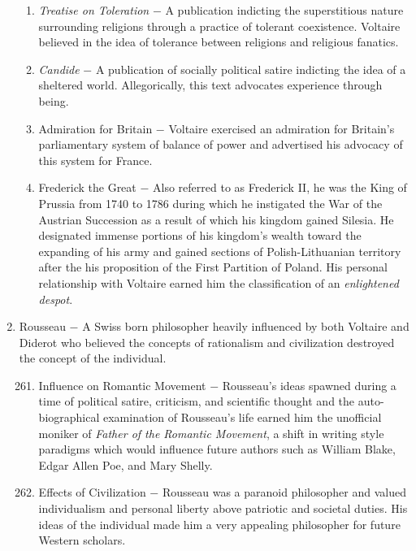 \documentclass[12pt]{article}
\begin{document}
\begin{enumerate}
\begin{enumerate}[label=\arabic{*}.]
\item \textit{Treatise on Toleration} $-$ A publication indicting the superstitious nature surrounding religions through a practice of tolerant coexistence. Voltaire believed in the idea of tolerance between religions and religious fanatics.

\item \textit{Candide} $-$ A publication of socially political satire indicting the idea of a sheltered world. Allegorically, this text advocates experience through being.

\item Admiration for Britain $-$ Voltaire exercised an admiration for Britain's parliamentary system of balance of power and advertised his advocacy of this system for France.

\item Frederick the Great $-$ Also referred to as Frederick II, he was the King of Prussia from 1740 to 1786 during which he instigated the War of the Austrian Succession as a result of which his kingdom gained Silesia. He designated immense portions of his kingdom's wealth toward the expanding of his army and gained sections of Polish-Lithuanian territory after the his proposition of the First Partition of Poland. His personal relationship with Voltaire earned him the classification of an \textit{enlightened despot}.

\end{enumerate}
\setcounter{enumi}{259}

\item Rousseau $-$ A Swiss born philosopher heavily influenced by both Voltaire and Diderot who believed the concepts of rationalism and civilization destroyed the concept of the individual.

\begin{enumerate}[label=\arabic{*}.]
\setcounter{enumii}{260}

\item Influence on Romantic Movement $-$ Rousseau's ideas spawned during a time of political satire, criticism, and scientific thought and the auto-biographical examination of Rousseau's life earned him the unofficial moniker of \textit{Father of the Romantic Movement}, a shift in writing style paradigms which would influence future authors such as William Blake, Edgar Allen Poe, and Mary Shelly.

\item Effects of Civilization $-$ Rousseau was a paranoid philosopher and valued individualism and personal liberty above patriotic and societal duties. His ideas of the individual made him a very appealing philosopher for future Western scholars.


\end{enumerate}
\end{enumerate}
\end{document}
